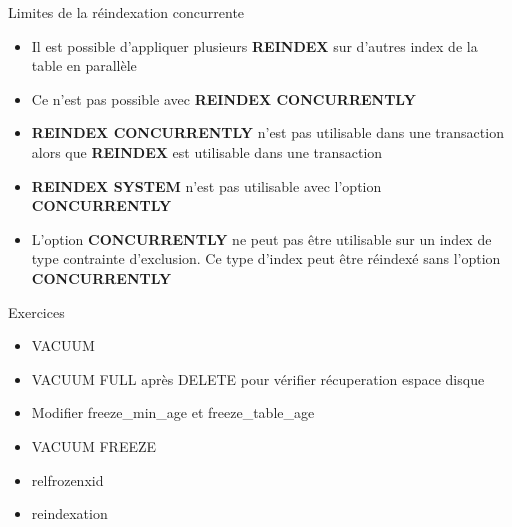 \begin{frame}[fragile]{Limites de la réindexation concurrente}

\begin{itemize}
   \item Il est possible d'appliquer plusieurs \textbf{REINDEX} sur d'autres index de la table en parallèle
   \item Ce n'est pas possible avec \textbf{REINDEX CONCURRENTLY}
   \item \textbf{REINDEX CONCURRENTLY} n'est pas utilisable dans une transaction alors que \textbf{REINDEX} est utilisable dans une transaction
   \item \textbf{REINDEX SYSTEM} n'est pas utilisable avec l'option \textbf{CONCURRENTLY}
   \item L'option \textbf{CONCURRENTLY} ne peut pas être utilisable sur un index de type contrainte d'exclusion. Ce type d'index peut être réindexé sans l'option \textbf{CONCURRENTLY}

\end{itemize}


\begin{tiny}
\begin{toile}
\end{toile}
\end{tiny}

\end{frame}


\begin{frame}[fragile]{Exercices}

   \begin{itemize}
\item VACUUM
\item VACUUM FULL après DELETE pour vérifier récuperation espace disque
\item Modifier freeze\_min\_age et freeze\_table\_age
\item VACUUM FREEZE
\item relfrozenxid
\item reindexation
   \end{itemize}

\end{frame}

